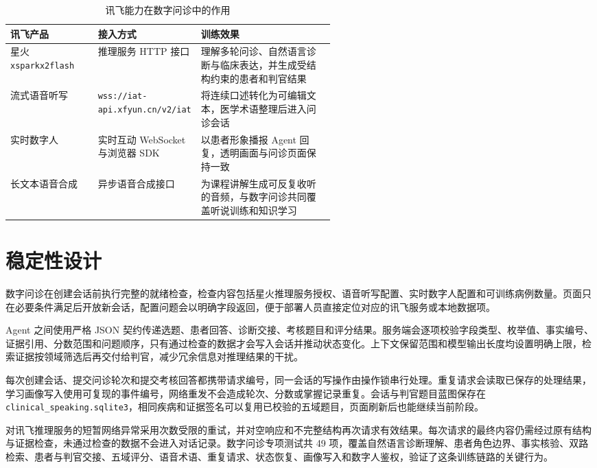 \begin{table}[H]
  \centering
  \caption{讯飞能力在数字问诊中的作用}
  \label{tab:clinical-xfyun-capabilities}
  \begin{tabularx}{\linewidth}{p{0.27\linewidth}p{0.28\linewidth}X}
    \toprule
    讯飞产品 & 接入方式 & 训练效果 \\
    \midrule
    星火 \texttt{xsparkx2flash} & 推理服务 HTTP 接口 & 理解多轮问诊、自然语言诊断与临床表达，并生成受结构约束的患者和判官结果 \\
    流式语音听写 & \texttt{wss://iat-api.xfyun.cn/v2/iat} & 将连续口述转化为可编辑文本，医学术语整理后进入问诊会话 \\
    实时数字人 & 实时互动 WebSocket 与浏览器 SDK & 以患者形象播报 Agent 回复，透明画面与问诊页面保持一致 \\
    长文本语音合成 & 异步语音合成接口 & 为课程讲解生成可反复收听的音频，与数字问诊共同覆盖听说训练和知识学习 \\
    \bottomrule
  \end{tabularx}
\end{table}

\section{稳定性设计}

数字问诊在创建会话前执行完整的就绪检查，检查内容包括星火推理服务授权、语音听写配置、实时数字人配置和可训练病例数量。页面只在必要条件满足后开放新会话，配置问题会以明确字段返回，便于部署人员直接定位对应的讯飞服务或本地数据项。

Agent 之间使用严格 JSON 契约传递选题、患者回答、诊断交接、考核题目和评分结果。服务端会逐项校验字段类型、枚举值、事实编号、证据引用、分数范围和问题顺序，只有通过检查的数据才会写入会话并推动状态变化。上下文保留范围和模型输出长度均设置明确上限，检索证据按领域筛选后再交付给判官，减少冗余信息对推理结果的干扰。

每次创建会话、提交问诊轮次和提交考核回答都携带请求编号，同一会话的写操作由操作锁串行处理。重复请求会读取已保存的处理结果，学习画像写入使用可复现的事件编号，网络重发不会造成轮次、分数或掌握记录重复。会话与判官题目蓝图保存在 \texttt{clinical\_speaking.sqlite3}，相同疾病和证据签名可以复用已校验的五域题目，页面刷新后也能继续当前阶段。

对讯飞推理服务的短暂网络异常采用次数受限的重试，并对空响应和不完整结构再次请求有效结果。每次请求的最终内容仍需经过原有结构与证据检查，未通过检查的数据不会进入对话记录。数字问诊专项测试共 49 项，覆盖自然语言诊断理解、患者角色边界、事实核验、双路检索、患者与判官交接、五域评分、语音术语、重复请求、状态恢复、画像写入和数字人鉴权，验证了这条训练链路的关键行为。
